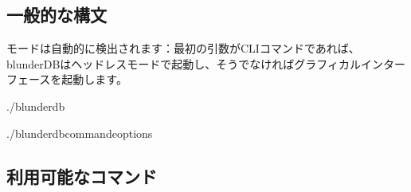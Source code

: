 \documentclass[letterpaper,10pt,dvipdfmx]{sphinxmanual}
\begin{document}
\subsection{一般的な構文}
\label{\detokenize{cli:syntaxe-generale}}
\sphinxAtStartPar
モードは自動的に検出されます：最初の引数がCLIコマンドであれば、blunderDBはヘッドレスモードで起動し、そうでなければグラフィカルインターフェースを起動します。

\begin{sphinxVerbatim}[commandchars=\\\{\}]
./blunderdb

./blunderdb\PYGZlt{}commande\PYGZgt{}\PYG{o}{[}options\PYG{o}{]}
\end{sphinxVerbatim}


\subsection{利用可能なコマンド}
\label{\detokenize{cli:commandes-disponibles}}
\end{document}
